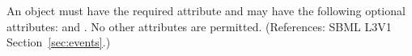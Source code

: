 An \EventAssignment object must have the required attribute 
 and may have the following optional attributes:
 and .  No other attributes are permitted.  
(References: SBML L3V1 Section~\ref{sec:events}.)
